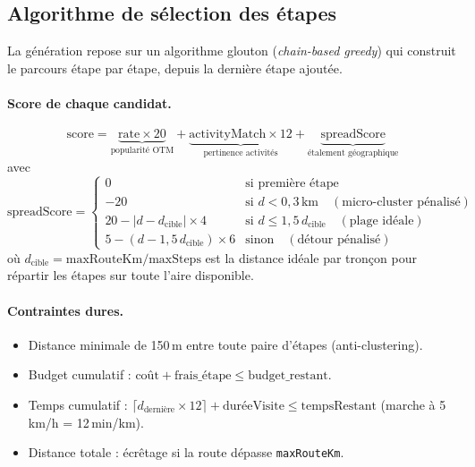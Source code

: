 \documentclass[a4paper,11pt]{article}
\begin{document}
\subsection{Algorithme de sélection des étapes}

La génération repose sur un algorithme glouton (\textit{chain-based greedy})
qui construit le parcours étape par étape, depuis la dernière étape ajoutée.

\paragraph{Score de chaque candidat.}
\[
  \text{score} =
    \underbrace{\text{rate} \times 20}_{\text{popularité OTM}}
  + \underbrace{\text{activityMatch} \times 12}_{\text{pertinence activités}}
  + \underbrace{\text{spreadScore}}_{\text{étalement géographique}}
\]
avec
\[
  \text{spreadScore} =
  \begin{cases}
    0    & \text{si première étape} \\
    -20  & \text{si } d < 0{,}3\,\text{km} \quad (\text{micro-cluster pénalisé}) \\
    20 - \lvert d - d_{\text{cible}} \rvert \times 4
         & \text{si } d \leq 1{,}5\,d_{\text{cible}} \quad (\text{plage idéale}) \\
    5 - (d - 1{,}5\,d_{\text{cible}}) \times 6
         & \text{sinon} \quad (\text{détour pénalisé})
  \end{cases}
\]
où $d_{\text{cible}} = \text{maxRouteKm} / \text{maxSteps}$ est la distance
idéale par tronçon pour répartir les étapes sur toute l'aire disponible.

\paragraph{Contraintes dures.}
\begin{itemize}[leftmargin=1.5em]
  \item Distance minimale de 150\,m entre toute paire d'étapes (anti-clustering).
  \item Budget cumulatif : $\text{coût} + \text{frais\_étape} \leq \text{budget\_restant}$.
  \item Temps cumulatif :
        $\lceil d_{\text{dernière}} \times 12 \rceil + \text{duréeVisite} \leq \text{tempsRestant}$
        (marche à 5\,km/h = 12\,min/km).
  \item Distance totale : écrêtage si la route dépasse \texttt{maxRouteKm}.
\end{itemize}
\end{document}
